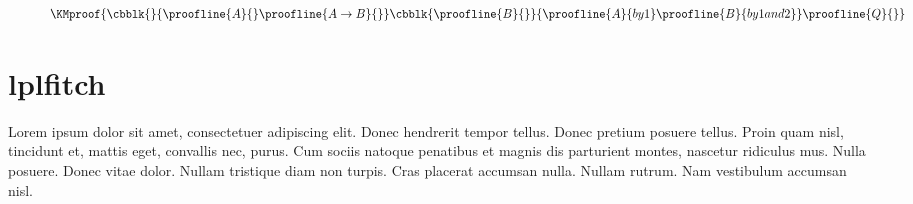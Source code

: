 \documentclass[class=article, crop=false]{standalone}
\begin{document}
\begin{figure}
\[
  \KMproof{
    \cbblk{}{
      \proofline{A}{}
      \proofline{A \rightarrow B}{}
    }
    \cbblk{
      \proofline{B}{}
    }{
      \proofline{A}{by 1}
      \proofline{B}{by 1 and 2}
    }
    \proofline{Q}{}
  }
\]
\caption{\label{eq:nd1}}
\end{figure}


\pagebreak
\section{lplfitch}

Lorem ipsum dolor sit amet, consectetuer adipiscing elit.  Donec hendrerit
tempor tellus.  Donec pretium posuere tellus.  Proin quam nisl, tincidunt et,
mattis eget, convallis nec, purus.  Cum sociis natoque penatibus et magnis dis
parturient montes, nascetur ridiculus mus.  Nulla posuere.  Donec vitae dolor.
Nullam tristique diam non turpis.  Cras placerat accumsan nulla.  Nullam rutrum.
Nam vestibulum accumsan nisl.



\begin{figure}
  \centering
  \caption{\label{eq:lpl1}}
\end{figure}


\IfStandalone{
  \nocite{*}
  
  
  }{}
\end{document}
